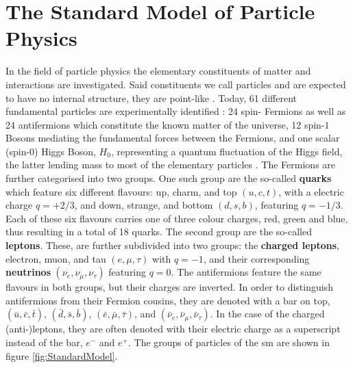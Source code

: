 \section{The Standard Model of Particle Physics} \label{sec:StandardModel}
In the field of particle physics the elementary constituents of matter and interactions are investigated. Said constituents we call particles and are expected to have no internal structure, \ie they are point-like \cite{Perkins}. Today, 61 different fundamental particles are experimentally identified \cite{Griffiths}: 24 spin-\textonehalf{} \glspl{Fermion} as well as 24 antifermions which constitute the known matter of the universe, 12 spin-$1$ \glspl{Boson} mediating the fundamental forces between the \glspl{Fermion}, and one scalar (spin-$0$) Higgs \gls{Boson}, $H_0$, representing a quantum fluctuation of the Higgs field, the latter lending mass to most of the elementary particles \cite{HiggsProperties, IntroductionQFT}. The \glspl{Fermion} are further categorised into two groups. One such group are the so-called \textbf{quarks} which feature six different flavours: up, charm, and top $(u,c,t)$, with a electric charge $q = +2/3$, and down, strange, and bottom $(d,s,b)$, featuring $q = -1/3$. Each of these six flavours carries one of three colour charges, \ie red, green and blue, thus resulting in a total of \num{18} quarks. The second group are the so-called \textbf{leptons}. These, are further subdivided into two groups: the \textbf{charged leptons}, electron, muon, and tau $(e,\mu,\tau)$ with $q=-1$, and their corresponding \textbf{neutrinos} $(\nu_e,\nu_\mu,\nu_\tau)$ featuring $q=0$. The antifermions feature the same flavours in both groups, but their charges are inverted. In order to distinguish antifermions from their \gls{Fermion} cousins, they are denoted with a bar on top, \ie $(\bar{u},\bar{c},\bar{t})$, $(\bar{d},\bar{s},\bar{b})$, $(\bar{e},\bar{\mu},\bar{\tau})$, and $(\bar{\nu}_e,\bar{\nu}_\mu,\bar{\nu}_\tau)$. In the case of the charged (anti-)leptons, they are often denoted with their electric charge as a superscript instead of the bar, \eg $e^-$ and $e^+$. The groups of particles of the \gls{sm} are shown in figure \ref{fig:StandardModel}.
